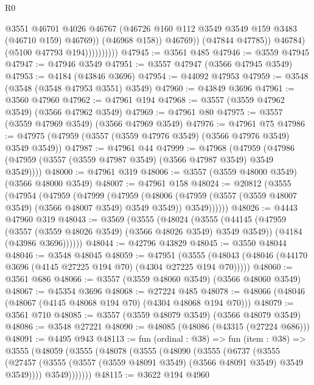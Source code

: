 \begin{lexlean}{R0}
\begin{coremodule}
                                  @3551
                                  @46701
                                  @4026
                                  @46767
                                  (@46726 @160 @112 @3549 @3549 @159 @3483 (@46710 @159) @46769))
                                (@46968 @158))
                              @46769))
                          (@47844 @47785))
                        @46784)
                      (@5100 @47793 @194))))))))))
@47945 := @3561 @485
@47946 := @3559 @47945
@47947 := @47946 @3549
@47951 := @3557 @47947 (@3566 @47945 @3549)
@47953 := @4184 (@43846 @3696)
@47954 := @44092 @47953
@47959 := @3548 (@3548 (@3548 @47953 @3551) @3549)
@47960 := @43849 @3696
@47961 := @3560 @47960
@47962 := @47961 @194
@47968 := @3557 (@3559 @47962 @3549) (@3566 @47962 @3549)
@47969 := @47961 @80
@47975 := @3557 (@3559 @47969 @3549) (@3566 @47969 @3549)
@47976 := @47961 @75
@47986 := @47975 (@47959 (@3557 (@3559 @47976 @3549) (@3566 @47976 @3549) @3549 @3549))
@47987 := @47961 @44
@47999 := @47968
    (@47959 (@47986 (@47959 (@3557 (@3559 @47987 @3549) (@3566 @47987 @3549) @3549 @3549))))
@48000 := @47961 @319
@48006 := @3557 (@3559 @48000 @3549) (@3566 @48000 @3549)
@48007 := @47961 @158
@48024 := @20812
    (@3555
      (@47954
        (@47959
          (@47999
            (@47959
              (@48006
                (@47959 (@3557 (@3559 @48007 @3549) (@3566 @48007 @3549) @3549 @3549))
                @3549))))))
@48026 := @4443 @47960 @319
@48043 := @3569
    (@3555
      (@48024
        (@3555
          (@44145
            (@47959 (@3557 (@3559 @48026 @3549) (@3566 @48026 @3549) @3549 @3549))
            (@4184 (@43986 @3696))))))
@48044 := @42796 @43829
@48045 := @3550 @48044
@48046 := @3548 @48045
@48059 := @47951
    (@3555 (@48043 (@48046 (@44170 @3696 (@4145 @27225 @194 @70) (@4304 @27225 @194 @70)))))
@48060 := @3561 @686
@48066 := @3557 (@3559 @48060 @3549) (@3566 @48060 @3549)
@48067 := @45354 @3696
@48068 := @27224 @485
@48078 := @48066 (@48046 (@48067 (@4145 @48068 @194 @70) (@4304 @48068 @194 @70)))
@48079 := @3561 @710
@48085 := @3557 (@3559 @48079 @3549) (@3566 @48079 @3549)
@48086 := @3548 @27221
@48090 := @48085 (@48086 (@43315 (@27224 @686)))
@48091 := @4495 @943
@48113 := fun (ordinal : @38) =>
  fun (item : @38) =>
  @3555
    (@48059
      (@3555
        (@48078
          (@3555
            (@48090
              (@3555
                (@6737
                  (@3555
                    (@27457 (@3555 (@3557 (@3559 @48091 @3549) (@3566 @48091 @3549) @3549 @3549))))
                  @3549)))))))
@48115 := @3622 @194 @4960

\end{coremodule}
\end{lexlean}
